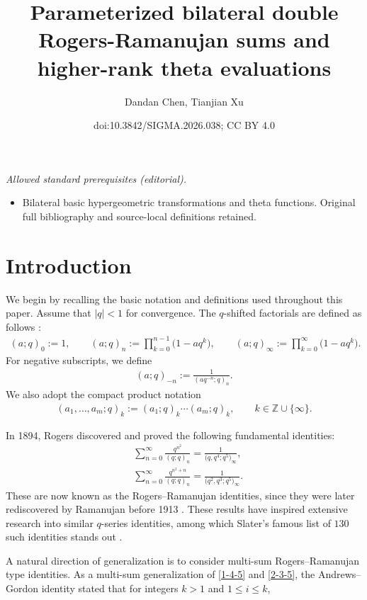 \documentclass[10pt,a4paper]{amsart}
\title{Parameterized bilateral double Rogers-Ramanujan sums and higher-rank theta evaluations}
\author{Dandan Chen, Tianjian Xu}
\date{doi:10.3842/SIGMA.2026.038; CC BY 4.0}
\numberwithin{equation}{section}
\theoremstyle{definition}
\begin{document}
\maketitle
\noindent\textit{Allowed standard prerequisites (editorial).}\begin{itemize}
\item Bilateral basic hypergeometric transformations and theta functions. Original full bibliography and source-local definitions retained.
\end{itemize}\medskip
\section{Introduction}
We begin by recalling the basic notation and definitions used throughout this paper. Assume that $|q|<1$ for convergence. The $q$-shifted factorials are defined as follows \cite{red}:
\begin{align*}
 (a;q)_0:=1,\qquad (a; q)_n := \prod_{k=0}^{n-1} \bigl(1 - a q^k\bigr),\qquad (a; q)_\infty := \prod_{k=0}^{\infty} \bigl(1 - a q^k\bigr).
\end{align*}
For negative subscripts, we define
\begin{align*}
 (a;q)_{-n}:=\frac{1}{(aq^{-n};q)_n}.
\end{align*}
We also adopt the compact product notation
\begin{align*}
 (a_1, \dots, a_m; q)_k := (a_1; q)_k \cdots (a_m; q)_k, \qquad k \in \mathbb{Z} \cup \{\infty\}.
\end{align*}\par
In 1894, Rogers \cite{Rogers-1894} discovered and proved the following fundamental identities:
\begin{align}
&\sum_{n=0}^{\infty}\frac{q^{n^2}}{(q;q)_n}=\frac{1}{\bigl(q,q^4;q^5\bigr)_{\infty}},\label{1-4-5}\\
&\sum_{n=0}^{\infty}\frac{q^{n^2+n}}{(q;q)_n}=\frac{1}{\bigl(q^2,q^3;q^5\bigr)_{\infty}}.\label{2-3-5}
\end{align}
These are now known as the Rogers--Ramanujan identities, since they were later rediscovered by Ramanujan before 1913 \cite{Hardy-1937}. These results have inspired extensive research into similar $q$-series identities, among which Slater's famous list of $130$ such identities stands out \cite{Slater-1952}. \par
A natural direction of generalization is to consider multi-sum Rogers--Ramanujan type identities. As a multi-sum generalization of \eqref{1-4-5} and \eqref{2-3-5}, the Andrews--Gordon identity \cite{Andrews-1974} stated that for integers $k>1$ and $1\leq i\leq k$,
\end{document}
